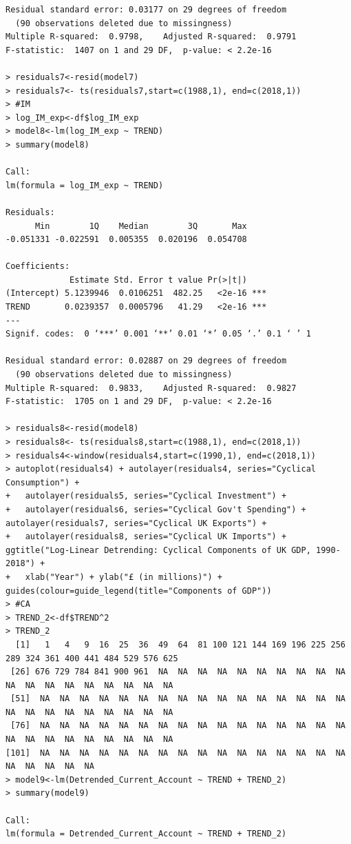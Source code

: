 \documentclass[12pt]{article}
\begin{document}
\begin{verbatim}
Residual standard error: 0.03177 on 29 degrees of freedom
  (90 observations deleted due to missingness)
Multiple R-squared:  0.9798,	Adjusted R-squared:  0.9791 
F-statistic:  1407 on 1 and 29 DF,  p-value: < 2.2e-16

> residuals7<-resid(model7)
> residuals7<- ts(residuals7,start=c(1988,1), end=c(2018,1))
> #IM
> log_IM_exp<-df$log_IM_exp
> model8<-lm(log_IM_exp ~ TREND)
> summary(model8)

Call:
lm(formula = log_IM_exp ~ TREND)

Residuals:
      Min        1Q    Median        3Q       Max 
-0.051331 -0.022591  0.005355  0.020196  0.054708 

Coefficients:
             Estimate Std. Error t value Pr(>|t|)    
(Intercept) 5.1239946  0.0106251  482.25   <2e-16 ***
TREND       0.0239357  0.0005796   41.29   <2e-16 ***
---
Signif. codes:  0 ‘***’ 0.001 ‘**’ 0.01 ‘*’ 0.05 ‘.’ 0.1 ‘ ’ 1

Residual standard error: 0.02887 on 29 degrees of freedom
  (90 observations deleted due to missingness)
Multiple R-squared:  0.9833,	Adjusted R-squared:  0.9827 
F-statistic:  1705 on 1 and 29 DF,  p-value: < 2.2e-16

> residuals8<-resid(model8)
> residuals8<- ts(residuals8,start=c(1988,1), end=c(2018,1))
> residuals4<-window(residuals4,start=c(1990,1), end=c(2018,1)) 
> autoplot(residuals4) + autolayer(residuals4, series="Cyclical Consumption") + 
+   autolayer(residuals5, series="Cyclical Investment") +
+   autolayer(residuals6, series="Cyclical Gov't Spending") + autolayer(residuals7, series="Cyclical UK Exports") +
+   autolayer(residuals8, series="Cyclical UK Imports") + ggtitle("Log-Linear Detrending: Cyclical Components of UK GDP, 1990-2018") + 
+   xlab("Year") + ylab("£ (in millions)") + guides(colour=guide_legend(title="Components of GDP"))
> #CA
> TREND_2<-df$TREND^2
> TREND_2
  [1]   1   4   9  16  25  36  49  64  81 100 121 144 169 196 225 256 289 324 361 400 441 484 529 576 625
 [26] 676 729 784 841 900 961  NA  NA  NA  NA  NA  NA  NA  NA  NA  NA  NA  NA  NA  NA  NA  NA  NA  NA  NA
 [51]  NA  NA  NA  NA  NA  NA  NA  NA  NA  NA  NA  NA  NA  NA  NA  NA  NA  NA  NA  NA  NA  NA  NA  NA  NA
 [76]  NA  NA  NA  NA  NA  NA  NA  NA  NA  NA  NA  NA  NA  NA  NA  NA  NA  NA  NA  NA  NA  NA  NA  NA  NA
[101]  NA  NA  NA  NA  NA  NA  NA  NA  NA  NA  NA  NA  NA  NA  NA  NA  NA  NA  NA  NA  NA
> model9<-lm(Detrended_Current_Account ~ TREND + TREND_2)
> summary(model9)

Call:
lm(formula = Detrended_Current_Account ~ TREND + TREND_2)


\end{verbatim}
\end{document}
